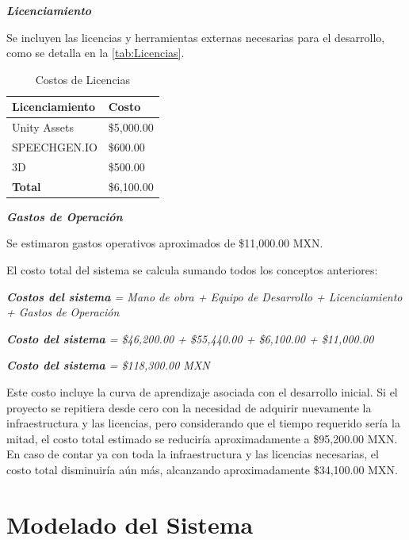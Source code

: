 \textit{\textbf{Licenciamiento}}

Se incluyen las licencias y herramientas externas necesarias para el desarrollo, como se detalla en la \autoref{tab:Licencias}.
\begin{table}[H]
  \centering
  \begin{tabular}{|>{\centering\arraybackslash}m{}|>{\centering\arraybackslash}m{}|}
    \hline
    \rowcolor{blue_escom}
     \textbf{Licenciamiento} & \textbf{Costo}\\
     \hline
     Unity Assets & \$5,000.00\\
     SPEECHGEN.IO & \$600.00\\
     3D & \$500.00\\
     \hline
     \rowcolor{column_color}
     \textbf{Total} & \$6,100.00\\
     \hline
  \end{tabular}
  \caption{Costos de Licencias}
  \label{tab:Licencias}
\end{table}

\textit{\textbf{Gastos de Operación}}

Se estimaron gastos operativos aproximados de \$11,000.00 MXN.

El costo total del sistema se calcula sumando todos los conceptos anteriores:

\begin{center}
    \textit{\textbf{Costos del sistema} = Mano de obra + Equipo de Desarrollo + Licenciamiento + Gastos de Operación}
    
    \textit{\textbf{Costo del sistema} = \$46,200.00 + \$55,440.00 + \$6,100.00 + \$11,000.00}
    
    \textit{\textbf{Costo del sistema} = \$118,300.00 MXN}
\end{center}

Este costo incluye la curva de aprendizaje asociada con el desarrollo inicial. Si el proyecto se repitiera desde cero con la necesidad de adquirir nuevamente la infraestructura y las licencias, pero considerando que el tiempo requerido sería la mitad, el costo total estimado se reduciría aproximadamente a \$95,200.00 MXN. En caso de contar ya con toda la infraestructura y las licencias necesarias, el costo total disminuiría aún más, alcanzando aproximadamente \$34,100.00 MXN.

\section{Modelado del Sistema}

